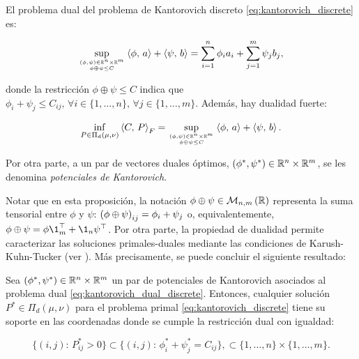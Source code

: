 \begin{prop}
	\label{prop:duality_discrete}
	El problema dual del problema de Kantorovich discreto \eqref{eq:kantorovich_discrete} es:

	\begin{equation}
		\label{eq:kantorovich_dual_discrete}
		\sup_{\feasible{(\phi,\psi)\in\R^n\times\R^m} {\phi\oplus \psi \leq C}}
		\dotproduct{\phi}{a} + \dotproduct{\psi}{b} = \sum_{i=1}^n \phi_i a_i + \sum_{j=1}^m \psi_j b_j ,
	\end{equation}

	donde la restricción $\phi\oplus \psi \leq C$ indica que $\phi_i+\psi_j \leq C_{ij}, \, \forall i\in\{1,\ldots,n\}, \, \forall j\in\{1,\ldots,m\}$. Además, hay dualidad fuerte:

	\begin{equation}
		\label{eq:kantorovich_strong_duality_discrete}
		\inf_{P\in \Pi_d(\mu,\nu)} \dotproduct{C}{P}_F
		= \sup_{\feasible{(\phi,\psi)\in\R^n\times\R^m}{\phi\oplus \psi \leq C}}
		\dotproduct{\phi}{a} + \dotproduct{\psi}{b}.
	\end{equation}

	Por otra parte, a un par de vectores duales óptimos, $(\phi^*,\psi^*)\in\mathbb{R}^n\times\mathbb{R}^m$, se les denomina \textit{potenciales de Kantorovich}.
\end{prop}

Notar que en esta proposición, la notación $\phi\oplus\psi\in\mathcal{M}_{n,m}\left(\mathbb{R}\right)$ representa la suma tensorial entre $\phi$ y $\psi$: $\left(\phi\oplus\psi\right)_{ij}=\phi_i+\psi_j$ o, equivalentemente, $\phi\oplus\psi = \phi\1_m^\top + \1_n \psi^\top$. Por otra parte, la propiedad de dualidad permite caracterizar las soluciones primales-duales mediante las condiciones de Karush-Kuhn-Tucker (ver \cite{boyd2004convex}). Más precisamente, se puede concluir el siguiente resultado:

\begin{cor}
	Sea $(\phi^*,\psi^*)\in\mathbb{R}^n\times\mathbb{R}^m$ un par de potenciales de Kantorovich asociados al problema dual \eqref{eq:kantorovich_dual_discrete}. Entonces, cualquier solución $P^*\in\Pi_d(\mu,\nu)$ para el problema primal \eqref{eq:kantorovich_discrete} tiene su soporte en las coordenadas donde se cumple la restricción dual con igualdad:

	\begin{equation*}
		\{(i,j):\,P_{ij}^*>0\}
		\subset \{(i,j):\, \phi^*_i + \psi^*_j = C_{ij}\},
		\subset \{1,\ldots,n\}\times\{1,\ldots,m\}.
	\end{equation*}

\end{cor}

